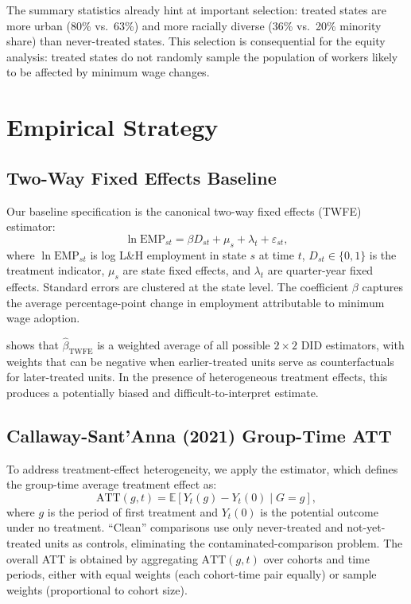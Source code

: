 \documentclass[12pt]{article}
\begin{document}
The summary statistics already hint at important selection: treated states are
more urban (80\% vs.\ 63\%) and more racially diverse (36\% vs.\ 20\% minority
share) than never-treated states.  This selection is consequential for the
equity analysis: treated states do not randomly sample the population of
workers likely to be affected by minimum wage changes.

\section{Empirical Strategy}
\label{sec:methods}

\subsection{Two-Way Fixed Effects Baseline}

Our baseline specification is the canonical two-way fixed effects (TWFE)
estimator:
\begin{equation}
  \ln \text{EMP}_{st} = \beta D_{st} + \mu_s + \lambda_t + \varepsilon_{st},
  \label{eq:twfe}
\end{equation}
where $\ln\text{EMP}_{st}$ is log L\&H employment in state $s$ at time $t$,
$D_{st} \in \{0,1\}$ is the treatment indicator, $\mu_s$ are state fixed
effects, and $\lambda_t$ are quarter-year fixed effects.  Standard errors are
clustered at the state level.  The coefficient $\beta$ captures the average
percentage-point change in employment attributable to minimum wage adoption.

\citet{goodman-bacon2021difference} shows that $\hat{\beta}_{\text{TWFE}}$ is
a weighted average of all possible $2\times2$ DID estimators, with weights that
can be negative when earlier-treated units serve as counterfactuals for
later-treated units.  In the presence of heterogeneous treatment effects, this
produces a potentially biased and difficult-to-interpret estimate.

\subsection{Callaway-Sant'Anna (2021) Group-Time ATT}

To address treatment-effect heterogeneity, we apply the \citet{callaway2021difference}
estimator, which defines the group-time average treatment effect as:
\begin{equation}
  \text{ATT}(g,t) = \mathbb{E}[Y_t(g) - Y_t(0) \mid G = g],
\end{equation}
where $g$ is the period of first treatment and $Y_t(0)$ is the potential
outcome under no treatment.  ``Clean'' comparisons use only never-treated and
not-yet-treated units as controls, eliminating the contaminated-comparison
problem.  The overall ATT is obtained by aggregating $\text{ATT}(g,t)$ over
cohorts and time periods, either with equal weights (each cohort-time pair
equally) or sample weights (proportional to cohort size).
\end{document}
